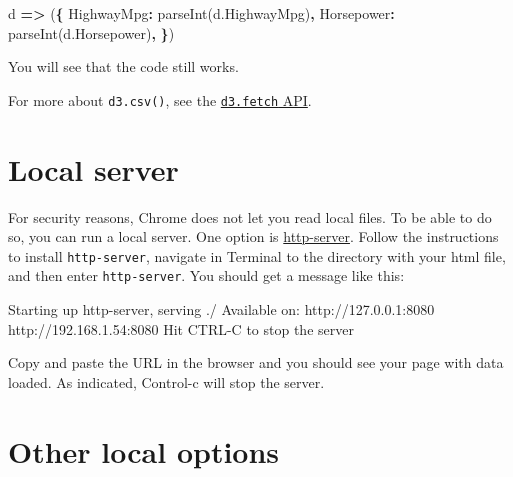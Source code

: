 \documentclass[openany]{book}
\newenvironment{Shaded}{\begin{snugshade}}{\end{snugshade}}
\newcommand{\AttributeTok}[1]{\textcolor[rgb]{0.77,0.63,0.00}{#1}}
\newcommand{\DataTypeTok}[1]{\textcolor[rgb]{0.13,0.29,0.53}{#1}}
\newcommand{\ExtensionTok}[1]{#1}
\newcommand{\NormalTok}[1]{#1}
\newcommand{\OperatorTok}[1]{\textcolor[rgb]{0.81,0.36,0.00}{\textbf{#1}}}
\newcommand{\VariableTok}[1]{\textcolor[rgb]{0.00,0.00,0.00}{#1}}
\begin{document}
\begin{Shaded}
\begin{Highlighting}[]
\NormalTok{d }\OperatorTok{=>}\NormalTok{ (}\OperatorTok{\{}
            \DataTypeTok{HighwayMpg}\OperatorTok{:} \AttributeTok{parseInt}\NormalTok{(}\VariableTok{d}\NormalTok{.}\AttributeTok{HighwayMpg}\NormalTok{)}\OperatorTok{,}
            \DataTypeTok{Horsepower}\OperatorTok{:} \AttributeTok{parseInt}\NormalTok{(}\VariableTok{d}\NormalTok{.}\AttributeTok{Horsepower}\NormalTok{)}\OperatorTok{,}
        \OperatorTok{\}}\NormalTok{)}
\end{Highlighting}
\end{Shaded}

You will see that the code still works.

For more about \texttt{d3.csv()}, see the \href{https://github.com/d3/d3-fetch/blob/v1.1.2/README.md\#csv}{\texttt{d3.fetch} API}.

\hypertarget{local-server}{%
\section{Local server}\label{local-server}}

For security reasons, Chrome does not let you read local files. To be able to do so, you can run a local server. One option is \href{https://www.npmjs.com/package/http-server}{http-server}. Follow the instructions to install \texttt{http-server}, navigate in Terminal to the directory with your html file, and then enter \texttt{http-server}. You should get a message like this:

\begin{Shaded}
\begin{Highlighting}[]
\ExtensionTok{Starting}\NormalTok{ up http-server, serving ./}
\ExtensionTok{Available}\NormalTok{ on:}
  \ExtensionTok{http}\NormalTok{://127.0.0.1:8080}
  \ExtensionTok{http}\NormalTok{://192.168.1.54:8080}
\ExtensionTok{Hit}\NormalTok{ CTRL-C to stop the server}
\end{Highlighting}
\end{Shaded}

Copy and paste the URL in the browser and you should see your page with data loaded. As indicated, Control-c will stop the server.

\hypertarget{other-local-options}{%
\section{Other local options}\label{other-local-options}}
\end{document}
